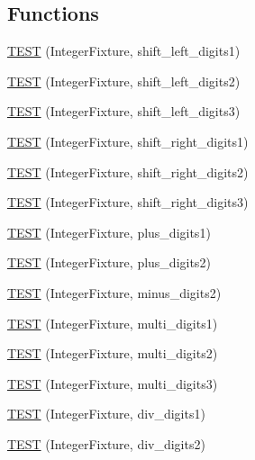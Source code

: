\subsection*{Functions}
\begin{DoxyCompactItemize}
\item 
\hyperlink{_test_integer_8c_09_09_a8288116f448b61e2a5a4c55aa66b97e3}{T\-E\-S\-T} (Integer\-Fixture, shift\-\_\-left\-\_\-digits1)
\item 
\hyperlink{_test_integer_8c_09_09_a3d64070550d28bb972ec4408d63f02d5}{T\-E\-S\-T} (Integer\-Fixture, shift\-\_\-left\-\_\-digits2)
\item 
\hyperlink{_test_integer_8c_09_09_a39040249cea00b4f811838c332b8229e}{T\-E\-S\-T} (Integer\-Fixture, shift\-\_\-left\-\_\-digits3)
\item 
\hyperlink{_test_integer_8c_09_09_aa701570931d7da9d42205e684d1a726f}{T\-E\-S\-T} (Integer\-Fixture, shift\-\_\-right\-\_\-digits1)
\item 
\hyperlink{_test_integer_8c_09_09_ab4f4fe81df2f959135d83b4a143288c7}{T\-E\-S\-T} (Integer\-Fixture, shift\-\_\-right\-\_\-digits2)
\item 
\hyperlink{_test_integer_8c_09_09_a219e911c528b244cdfb56832cb415280}{T\-E\-S\-T} (Integer\-Fixture, shift\-\_\-right\-\_\-digits3)
\item 
\hyperlink{_test_integer_8c_09_09_a865f7a930ad275cdac66ffed2c29cb07}{T\-E\-S\-T} (Integer\-Fixture, plus\-\_\-digits1)
\item 
\hyperlink{_test_integer_8c_09_09_aa6143c6227d4513053ba66dab5316acf}{T\-E\-S\-T} (Integer\-Fixture, plus\-\_\-digits2)
\item 
\hyperlink{_test_integer_8c_09_09_a7e176583d48ad22009d0ec64d0766b2c}{T\-E\-S\-T} (Integer\-Fixture, minus\-\_\-digits2)
\item 
\hyperlink{_test_integer_8c_09_09_a488b5cf72c10bea74b1155a6c59cb687}{T\-E\-S\-T} (Integer\-Fixture, multi\-\_\-digits1)
\item 
\hyperlink{_test_integer_8c_09_09_abefcf22c89dbebc2e01a0d460e8a56c3}{T\-E\-S\-T} (Integer\-Fixture, multi\-\_\-digits2)
\item 
\hyperlink{_test_integer_8c_09_09_af81d16018738bc4d71c7a5837dc56fa9}{T\-E\-S\-T} (Integer\-Fixture, multi\-\_\-digits3)
\item 
\hyperlink{_test_integer_8c_09_09_adf542893cccba9c2f3294430320eccc4}{T\-E\-S\-T} (Integer\-Fixture, div\-\_\-digits1)
\item 
\hyperlink{_test_integer_8c_09_09_aa4d6bed883aed0863e7b2cc1331b60ad}{T\-E\-S\-T} (Integer\-Fixture, div\-\_\-digits2)

\end{DoxyCompactItemize}
